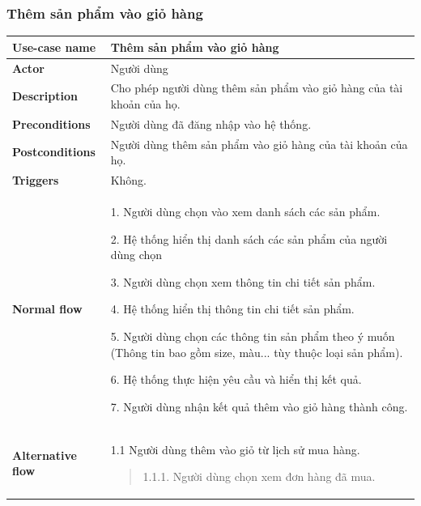 \subsubsection{ Thêm sản phẩm vào giỏ hàng}
{
    \setlength\extrarowheight{6pt}
    \begin{longtable}{| p{} | p{} |}
        \hline
        \textbf{Use-case name}
         &
        Thêm sản phẩm vào giỏ hàng
        \\
        \hline
        \textbf{Actor}
         &
        Người dùng
        \\
        \hline
        \textbf{Description}
         &
        Cho phép người dùng thêm sản phẩm vào giỏ hàng của tài khoản của họ.
        \\
        \hline
        \textbf{Preconditions}
         &
        Người dùng đã đăng nhập vào hệ thống.
        \\
        \hline
        \textbf{Postconditions}
         &
        Người dùng thêm sản phẩm vào giỏ hàng của tài khoản của họ.
        \\
        \hline
        \textbf{Triggers}
         &
        Không.
        \\
        \hline
        \begin{flushleft}
            \textbf{Normal flow}
        \end{flushleft}
         &
        1. Người dùng chọn vào xem danh sách các sản phẩm.

        2. Hệ thống hiển thị danh sách các sản phẩm của người dùng chọn

        3. Người dùng chọn xem thông tin chi tiết sản phẩm.

        4. Hệ thống hiển thị thông tin chi tiết sản phẩm.

        5. Người dùng chọn các thông tin sản phẩm theo ý muốn (Thông tin bao gồm size, màu... tùy thuộc loại sản phẩm).

        6. Hệ thống thực hiện yêu cầu và hiển thị kết quả.

        7. Người dùng nhận kết quả thêm vào giỏ hàng thành công.
        \\
        \hline
        \begin{flushleft}
            \textbf{Alternative flow}
        \end{flushleft}
         &
        1.1 Người dùng thêm vào giỏ từ lịch sử mua hàng.
        \begin{quote}
            1.1.1. Người dùng chọn xem đơn hàng đã mua.


\end{quote}
\end{longtable}}
